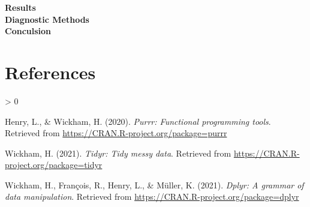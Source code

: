 \documentclass[
  english,
  man,floatsintext]{apa6}
\newlength{\cslhangindent}
\newenvironment{CSLReferences}[2] %
 {%
  \setlength{\parindent}{0pt}
  \ifodd #1 \everypar{\setlength{\hangindent}{\cslhangindent}}\ignorespaces\fi
  \ifnum #2 > 0
  \setlength{\parskip}{#2\baselineskip}
  \fi
 }%
 {}
\begin{document}
\textbf{Results}\\
\textbf{Diagnostic Methods}\\
\textbf{Conculsion}\\

\newpage

\hypertarget{references}{%
\section{References}\label{references}}

\begingroup
\setlength{\parindent}{-0.5in}
\setlength{\leftskip}{0.5in}

\hypertarget{refs}{}
\begin{CSLReferences}{1}{0}
\leavevmode\hypertarget{ref-R-purrr}{}%
Henry, L., \& Wickham, H. (2020). \emph{Purrr: Functional programming tools}. Retrieved from \url{https://CRAN.R-project.org/package=purrr}

\leavevmode\hypertarget{ref-R-tidyr}{}%
Wickham, H. (2021). \emph{Tidyr: Tidy messy data}. Retrieved from \url{https://CRAN.R-project.org/package=tidyr}

\leavevmode\hypertarget{ref-R-dplyr}{}%
Wickham, H., François, R., Henry, L., \& Müller, K. (2021). \emph{Dplyr: A grammar of data manipulation}. Retrieved from \url{https://CRAN.R-project.org/package=dplyr}

\end{CSLReferences}

\endgroup
\end{document}
